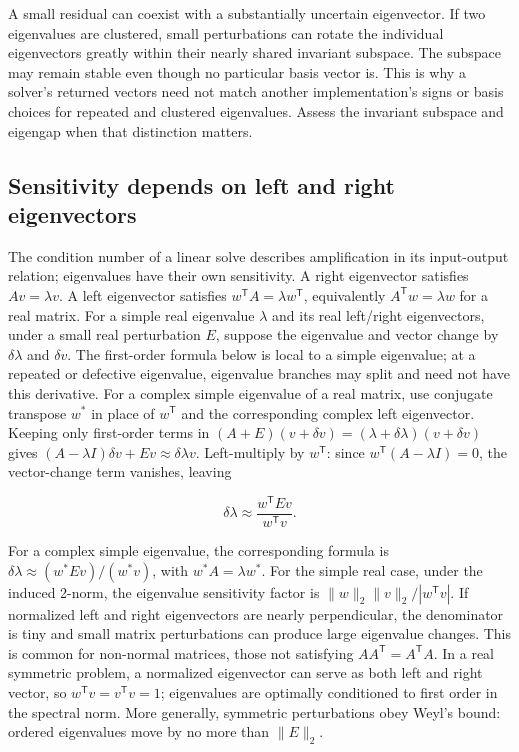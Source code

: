 A small residual can coexist with a substantially uncertain eigenvector. If two eigenvalues are clustered, small perturbations can rotate the individual eigenvectors greatly within their nearly shared invariant subspace. The subspace may remain stable even though no particular basis vector is. This is why a solver's returned vectors need not match another implementation's signs or basis choices for repeated and clustered eigenvalues. Assess the invariant subspace and eigengap when that distinction matters.

\subsection{Sensitivity depends on left and right eigenvectors}\label{01-foundations-i-ch020-sensitivity-depends-on-left-and-right-eigenvectors}

\hypertarget{01-foundations-i-ch020-sensitivity-depends-on-left-and-right-eigenvectors}{}

The condition number of a linear solve describes amplification in its input-output relation; eigenvalues have their own sensitivity. A right eigenvector satisfies \(Av=\lambda v\). A left eigenvector satisfies \(w^\mathsf TA=\lambda w^\mathsf T\), equivalently \(A^\mathsf Tw=\lambda w\) for a real matrix. For a simple real eigenvalue \(\lambda\) and its real left/right eigenvectors, under a small real perturbation \(E\), suppose the eigenvalue and vector change by \(\delta\lambda\) and \(\delta v\). The first-order formula below is local to a simple eigenvalue; at a repeated or defective eigenvalue, eigenvalue branches may split and need not have this derivative. For a complex simple eigenvalue of a real matrix, use conjugate transpose \(w^*\) in place of \(w^\mathsf T\) and the corresponding complex left eigenvector. Keeping only first-order terms in \((A+E)(v+\delta v)=(\lambda+\delta\lambda)(v+\delta v)\) gives \((A-\lambda I)\delta v+Ev\approx\delta\lambda v\). Left-multiply by \(w^\mathsf T\): since \(w^\mathsf T(A-\lambda I)=0\), the vector-change term vanishes, leaving

\[
\delta\lambda\approx\frac{w^\mathsf TEv}{w^\mathsf Tv}.
\]

For a complex simple eigenvalue, the corresponding formula is \(\delta\lambda\approx(w^*Ev)/(w^*v)\), with \(w^*A=\lambda w^*\). For the simple real case, under the induced 2-norm, the eigenvalue sensitivity factor is \(\|w\|_2\|v\|_2/|w^\mathsf Tv|\). If normalized left and right eigenvectors are nearly perpendicular, the denominator is tiny and small matrix perturbations can produce large eigenvalue changes. This is common for non-normal matrices, those not satisfying \(AA^\mathsf T=A^\mathsf TA\). In a real symmetric problem, a normalized eigenvector can serve as both left and right vector, so \(w^\mathsf Tv=v^\mathsf Tv=1\); eigenvalues are optimally conditioned to first order in the spectral norm. More generally, symmetric perturbations obey Weyl's bound: ordered eigenvalues move by no more than \(\|E\|_2\).

